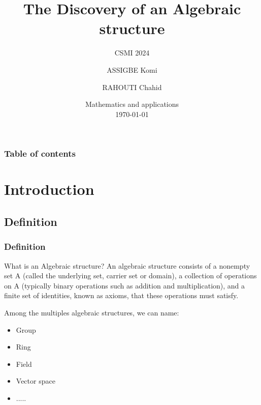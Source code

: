 \documentclass{beamer}
\title{The Discovery of an  Algebraic structure}
\subtitle{CSMI 2024}
\author[ASSIGBE Komi . RAHOUTI Chahid .]{ASSIGBE Komi \and  RAHOUTI Chahid}
\institute[]{University of Strasbourg \\ \smallskip} %
\date[\today]{Mathematics and applications \\ \today} %
\begin{document}

\begin{frame}
	\titlepage %
\end{frame}

\begin{frame}
    \frametitle{Table of contents}
    \tableofcontents
\end{frame}


\section{Introduction}


\subsection{Definition}
\begin{frame}
    \frametitle{Definition}
    What is an Algebraic structure? An algebraic structure consists of a nonempty set A (called the underlying set, carrier set or domain), a collection of operations on A (typically binary operations such as addition and multiplication), and a finite set of identities, known as axioms, that these operations must satisfy.

    Among the multiples algebraic structures, we can name:
    \begin{itemize}
        \item Group
        \item Ring
        \item Field
        \item Vector space
        \item .....
    \end{itemize}
\end{frame}
\end{document}
